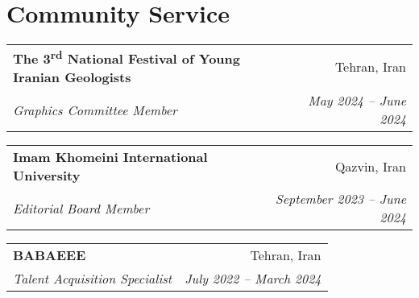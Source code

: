 \documentclass[letterpaper,11pt]{article}
\makeatletter
\newcommand{\ressubheading}[4]{%
	\begin{tabular*}{\textwidth}{l@{\cftdotfill{\cftsecdotsep}\extracolsep{\fill}}r}
		\textbf{#1} & #2 \\
		\textit{#3} & \textit{#4} \\
	\end{tabular*}\vspace{-8pt}
}
\makeatother
\begin{document}
	\section{Community Service}
	\ressubheading{The 3\textsuperscript{rd} National Festival of Young Iranian Geologists}{Tehran, Iran}{Graphics Committee Member}{May 2024 – June 2024}
	
	\vspace{0.99em} 
	
	\ressubheading{Imam Khomeini International University}{Qazvin, Iran}{Editorial Board Member}{September 2023 – June 2024}
	
	\vspace{0.99em} 
	
	\ressubheading{BABAEEE}{Tehran, Iran}{Talent Acquisition Specialist}{July 2022 – March 2024}
	\vspace{-0.9em} 
	
	
\end{document}

